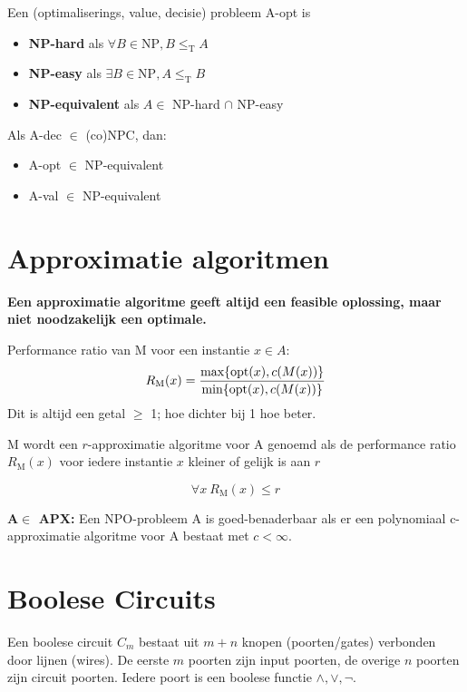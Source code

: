 \documentclass[]{article}
\begin{document}
\bigskip

Een (optimaliserings, value, decisie) probleem A-opt is

\begin{itemize}
\item \textbf{NP-hard} als $\forall B \in \text{NP}, B \leq_\text{T} A$
\item \textbf{NP-easy} als $\exists B \in \text{NP}, A \leq_\text{T} B$
\item \textbf{NP-equivalent} als $A \in$ NP-hard $\cap$ NP-easy
\end{itemize}

\bigskip

Als A-dec $\in$ (co)NPC, dan:
\begin{itemize}
\item A-opt $\in$ NP-equivalent
\item A-val $\in$ NP-equivalent
\end{itemize}

\section*{Approximatie algoritmen}

\textbf{Een approximatie algoritme geeft altijd een feasible oplossing, maar niet noodzakelijk een optimale.}

\medskip

Performance ratio van M voor een instantie $x \in A$:
\[
R_\text{M}(x) = {{ \text{max} \{ \text{opt}(x), c(M(x)) \} } \over { \text{min} \{ \text{opt}(x), c(M(x)) \} }}
\]
Dit is altijd een getal $\geq$ 1; hoe dichter bij 1 hoe beter.

\medskip

M wordt een $r$-approximatie algoritme voor A genoemd als de performance ratio $R_\text{M}(x)$ voor iedere instantie $x$ kleiner of gelijk is aan $r$

\[
\forall x ~ R_\text{M}(x) \leq r
\]

\medskip

\textbf{$\mathbf{A} \in$ APX:} Een NPO-probleem A is goed-benaderbaar als er een polynomiaal c-approximatie algoritme voor A bestaat met $c < \infty$.

\section*{Boolese Circuits}

Een boolese circuit $C_m$ bestaat uit $m+n$ knopen (poorten/gates) verbonden door lijnen (wires). De eerste $m$ poorten zijn input poorten, de overige $n$ poorten zijn circuit poorten. Iedere poort is een boolese functie $\wedge, \vee, \neg$.
\end{document}
